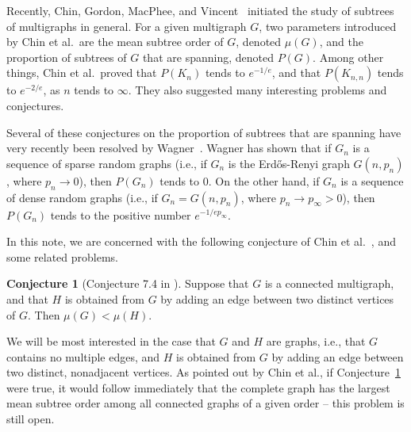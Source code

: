 \documentclass[12pt]{article}
\theoremstyle{definition}
\newtheorem{conjecture}[theorem]{Conjecture}
\begin{document}
Recently, Chin, Gordon, MacPhee, and Vincent~\cite{ChinGordonMacpheeVincent2018} initiated the study of subtrees of multigraphs in general. For a given multigraph $G$, two parameters introduced by Chin et al.~are the mean subtree order of $G$, denoted $\mu(G)$, and the proportion of subtrees of $G$ that are spanning, denoted $P(G)$.  Among other things, Chin et al.~proved that $P(K_n)$ tends to $e^{-1/e}$, and that $P(K_{n,n})$ tends to $e^{-2/e}$, as $n$ tends to $\infty$.  They also suggested many interesting problems and conjectures.

Several of these conjectures on the proportion of subtrees that are spanning have very recently been resolved by Wagner~\cite{Wagner2019}.  Wagner has shown that if $G_n$ is a sequence of sparse random graphs (i.e., if $G_n$ is the Erd\H{o}s-Renyi graph $G(n,p_n)$, where $p_n\rightarrow 0$), then $P(G_n)$ tends to $0$.  On the other hand, if $G_n$ is a sequence of dense random graphs (i.e., if $G_n=G(n,p_n)$, where $p_n\rightarrow p_\infty >0$), then $P(G_n)$ tends to the positive number $e^{-1/ep_{\infty}}$.

In this note, we are concerned with the following conjecture of Chin et al.~\cite{ChinGordonMacpheeVincent2018}, and some related problems.

\begin{conjecture}[Conjecture 7.4 in \cite{ChinGordonMacpheeVincent2018}]\label{ChinConjecture}
Suppose that $G$ is a connected multigraph, and that $H$ is obtained from $G$ by adding an edge
between two distinct vertices of $G$. Then $\mu(G)<\mu(H)$.
\end{conjecture}

\noindent
We will be most interested in the case that $G$ and $H$ are graphs, i.e., that $G$ contains no multiple edges, and $H$ is obtained from $G$ by adding an edge between two distinct, nonadjacent vertices.  As pointed out by Chin et al., if Conjecture~\ref{ChinConjecture} were true, it would follow immediately that the complete graph has the largest mean subtree order among all connected graphs of a given order -- this problem is still open.
\end{document}
